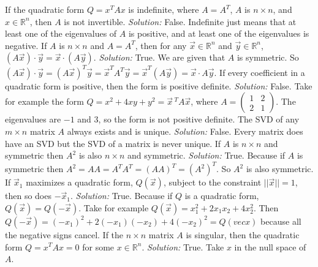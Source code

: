 \ifnum {}         
    If the quadratic form $Q = x^TAx$ is indefinite, where $A=A^T$, $A$ is $n\times n$, and $x \in \mathbb R^n$, then $A$ is not invertible.
    \ifnum {} {\color{DarkBlue} \textit{Solution:  } False. Indefinite just means that at least one of the eigenvalues of $A$ is positive, and at least one of the eigenvalues is negative.  } \fi
\fi
\ifnum {}      
    If $A$ is $n\times n$ and $A=A^T$, then for any $\vec x \in \mathbb R^n$  and $\vec y \in \mathbb R^n$, $ (A\vec x) \cdot \vec y = \vec x \cdot (A \vec y)$.  
    \ifnum {} {\color{DarkBlue} \textit{Solution:  } True. We are given that $A$ is symmetric. So  $ (A\vec x) \cdot \vec y = (A\vec x)^T \vec y = \vec x ^T A^T \vec y = \vec x ^T (A\vec y) = \vec x \cdot A\vec y$.  } \fi
\fi    
\ifnum {}  
    If every coefficient in a quadratic form is positive, then the form is positive definite. 
    \ifnum {} {\color{DarkBlue} \textit{Solution:  } False. Take for example the form $Q=x^2+4xy+y^2 = \vec x\, ^T A \vec x$, where \setlength{\extrarowheight}{0.0cm}
$A=\begin{pmatrix} 1&2\\2&1\end{pmatrix}$. The eigenvalues are $-1$ and $3$, so the form is not positive definite. } \fi
\fi    
\ifnum {}    
    The SVD of any $m\times n$ matrix $A$ always exists and is unique. 
    \ifnum {} {\color{DarkBlue} \textit{Solution:  } False. Every matrix does have an SVD but the SVD of a matrix is never unique.} \fi
\fi   
\ifnum {}    
    If $A$ is $n\times n$ and symmetric then $A^2$ is also $n\times n$ and  symmetric. 
    \ifnum {} {\color{DarkBlue} \textit{Solution:  } True. Because if $A$ is symmetric then $A^2 = AA = A^TA^T = (AA)^T= (A^2)^T$. So $A^2$ is also symmetric.  } \fi
\fi    
\ifnum {}      
    If $\vec x_1$ maximizes a quadratic form, $Q(\vec x)$, subject to the constraint $||\vec x|| = 1$, then so does $-\vec x_1$.
    \ifnum {} {\color{DarkBlue} \textit{Solution:  } True. Because if $Q$ is a quadratic form, $Q(\vec x) = Q(-\vec x)$. Take for example $Q(\vec x) = x_1^2 + 2x_1x_2 + 4x_2^2$. Then $Q(-\vec x) = (-x_1)^2 + 2(-x_1)(-x_2) + 4(-x_2)^2 = Q(
    vec x)$ because all the negative signs cancel. } \fi
\fi     
\ifnum {} 
    If the $n\times n$ matrix $A$ is singular, then the quadratic form $Q = x^TAx =0$ for some $x\in \mathbb R^n$.  
    \ifnum {} {\color{DarkBlue} \textit{Solution:  } True. 
    Take $x$ in the null space of $A$.} \fi
